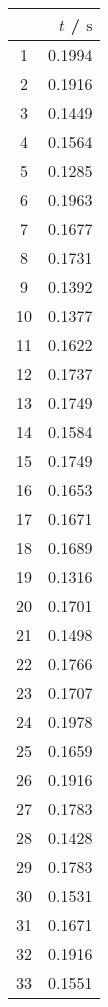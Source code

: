\begin{multicols}{4}

    \begin{table}[H]
        \centering
        \begin{tabular}{|c|r|}
            \hline
            & $t$ / $\mathrm{s}$ \\
            \hline
            1   & 0.1994 \\
            2   & 0.1916 \\
            3   & 0.1449 \\
            4   & 0.1564 \\
            5   & 0.1285 \\
            6   & 0.1963 \\
            7   & 0.1677 \\
            8   & 0.1731 \\
            9   & 0.1392 \\
            10  & 0.1377 \\
            11  & 0.1622 \\
            12  & 0.1737 \\
            13  & 0.1749 \\
            14  & 0.1584 \\
            15  & 0.1749 \\
            16  & 0.1653 \\
            17  & 0.1671 \\
            18  & 0.1689 \\
            19  & 0.1316 \\
            20  & 0.1701 \\
            21  & 0.1498 \\
            22  & 0.1766 \\
            23  & 0.1707 \\
            24  & 0.1978 \\
            25  & 0.1659 \\
            26  & 0.1916 \\
            27  & 0.1783 \\
            28  & 0.1428 \\
            29  & 0.1783 \\
            30  & 0.1531 \\
            31  & 0.1671 \\
            32  & 0.1916 \\
            33  & 0.1551 \\

\end{tabular}
\end{table}
\end{multicols}
